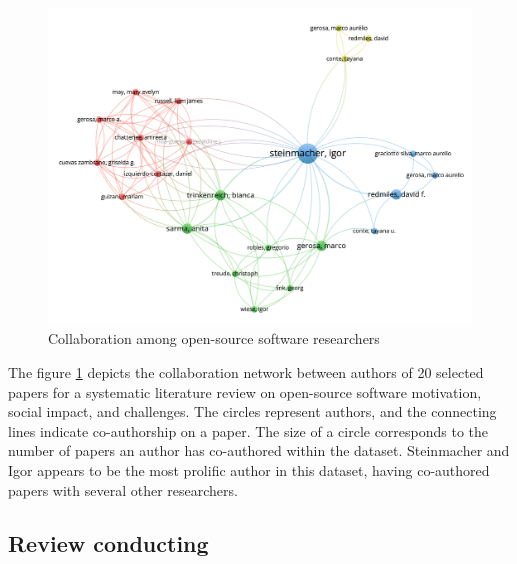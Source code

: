 \begin{figure}[ht]
\hspace*{-0.5in}
    \centering
    \includegraphics[width=1.1\linewidth]{figs/paperRelation.png}
    \caption{Collaboration among open-source software researchers}
    \label{fig:paperRelation}
\end{figure}

The figure \ref{fig:paperRelation} depicts the collaboration network between authors of 20 selected papers for a systematic literature review on open-source software motivation, social impact, and challenges. The circles represent authors, and the connecting lines indicate co-authorship on a paper. The size of a circle corresponds to the number of papers an author has co-authored within the dataset. Steinmacher and Igor  appears to be the most prolific author in this dataset, having co-authored papers with several other researchers.

\subsection{Review conducting}

